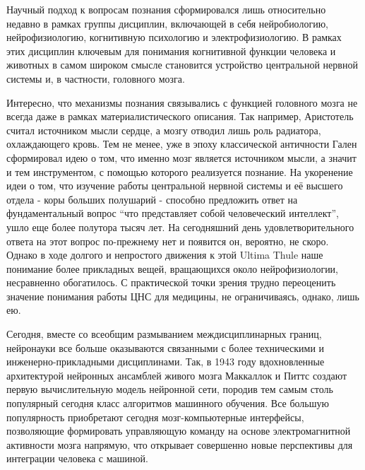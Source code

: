 Научный подход к вопросам познания сформировался лишь относительно недавно в рамках группы
дисциплин, включающей в себя нейробиологию, нейрофизиологию, когнитивную психологию и 
электрофизиологию. В рамках этих дисциплин ключевым для понимания когнитивной функции человека
и животных в самом широком смысле становится устройство центральной нервной системы и, в частности,
головного мозга.

Интересно, что механизмы познания связывались с функцией головного мозга не всегда даже
в рамках материалистического описания. Так например, Аристотель считал источником мысли сердце,
а мозгу отводил лишь роль радиатора, охлаждающего кровь. Тем не менее, уже в эпоху классической
античности Гален сформировал идею о том, что именно мозг является источником мысли,
а значит и тем инструментом, с помощью которого реализуется познание.
На укоренение идеи о том, что изучение работы центральной нервной системы и её высшего отдела
- коры больших полушарий - способно предложить ответ на фундаментальный вопрос
“что представляет собой человеческий интеллект”, ушло еще более полутора тысяч лет. 
На сегодняшний день удовлетворительного ответа на этот вопрос по-прежнему нет и появится он,
вероятно, не скоро. Однако в ходе  долгого и непростого движения к этой Ultima Thule
наше понимание более прикладных вещей, вращающихся около нейрофизиологии, несравненно обогатилось.
С практической точки зрения трудно переоценить значение понимания работы ЦНС для медицины, не ограничиваясь, однако, лишь ею. 

Сегодня, вместе со всеобщим размыванием междисциплинарных границ, нейронауки все больше оказываются
связанными с более техническими и инженерно-прикладными дисциплинами.
Так, в 1943 году вдохновленные архитектурой нейронных ансамблей живого мозга Маккаллок и Питтс
создают первую вычислительную модель нейронной сети, породив тем самым столь популярный сегодня
класс алгоритмов машинного обучения. Все большую популярность приобретают сегодня мозг-компьютерные интерфейсы,
позволяющие формировать управляющую команду на основе электромагнитной активности мозга напрямую,
что открывает совершенно новые перспективы для интеграции человека с машиной.


